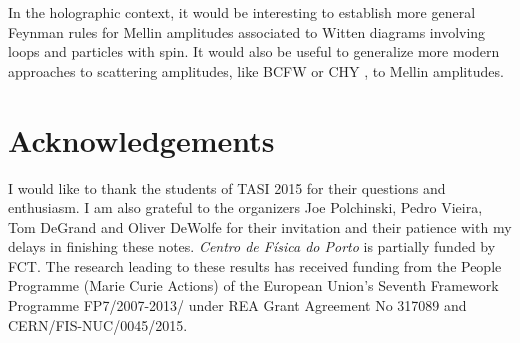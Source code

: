 \documentclass{ws-rv9x6}
\newif\ifarxivsubmission
\begin{document}
In the holographic context, it would be interesting to establish more general Feynman rules for Mellin amplitudes associated to Witten diagrams involving loops and particles with spin. 
It would also be useful to generalize more modern approaches to scattering amplitudes, like BCFW \cite{hep-th/0501052} or CHY \cite{arXiv:1307.2199}, to Mellin amplitudes.

\section*{Acknowledgements}
I would like to thank the students of TASI 2015 for their questions and enthusiasm. 
I am also grateful to the organizers Joe Polchinski, Pedro Vieira, Tom DeGrand and Oliver DeWolfe for their invitation and their patience with my delays in finishing these notes. 
\emph{Centro de F\'{i}sica do Porto} is partially funded by FCT. The research leading to these results has received funding from the People Programme (Marie Curie Actions) of the European Union's Seventh Framework Programme FP7/2007-2013/ under REA Grant Agreement No 317089 and CERN/FIS-NUC/0045/2015.
 


\ifarxivsubmission

\else

\fi





\ifarxivsubmission
\else
  \blankpage
\fi
\printindex
\end{document}
